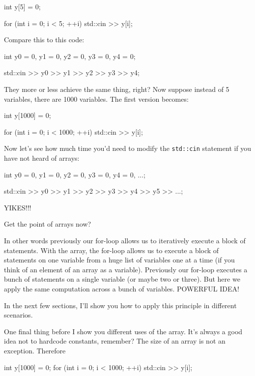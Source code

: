 \begin{consolethree}[escapeinside=||]
int y[5] = {0};

for (int i = 0; i < 5; ++i)
{
    std::cin >> y[i];
} 
\end{consolethree}

Compare this to this code:

\begin{consolethree}[escapeinside=||]
int y0 = 0, y1 = 0, y2 = 0, y3 = 0, y4 = 0;

std::cin >> y0 >> y1 >> y2 >> y3 >> y4; 
\end{consolethree}

They more or less achieve the same thing, right? Now suppose instead of 5 variables, there are 1000 variables. The first version becomes:

\begin{consolethree}[escapeinside=||]
int y[1000] = {0};

for (int i = 0; i < 1000; ++i)
{
    std::cin >> y[i];
}
\end{consolethree}

Now let's see how much time you'd need to modify the \texttt{std::cin} statement if you have not heard of arrays:

\begin{consolethree}[escapeinside=||]
int y0 = 0, y1 = 0, y2 = 0, y3 = 0, y4 = 0, ...;

std::cin >> y0 >> y1 >> y2 >> y3 >> y4 >> y5 >> ...; 
\end{consolethree}

YIKES!!!

Get the point of arrays now?

In other words previously our for-loop allows us to iteratively execute
a block of statements. With the array, the for-loop allows us to execute
a block of statements on one variable from a huge list of variables one
at a time (if you think of an element of an array as a variable).
Previously our for-loop executes a bunch of statements on a single
variable (or maybe two or three). But here we apply the same computation
across a bunch of variables. POWERFUL IDEA!

In the next few sections, I'll show you how to apply
this principle in different scenarios.

One final thing before I show you different uses of the array.
It's always a good idea not to hardcode constants,
remember? The size of an array is not an exception. Therefore

\begin{consolethree}[escapeinside=||]
int y[1000] = {0};
for (int i = 0; i < 1000; ++i)
{
    std::cin >> y[i];
} 
\end{consolethree}

